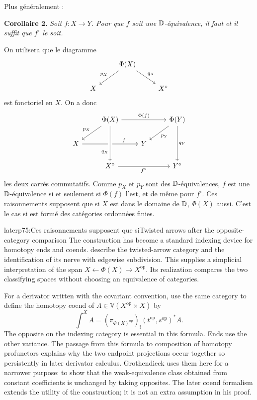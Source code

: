 \hspace*{\parindent}Plus généralement :

\textbf{Corollaire 2.} \textit{Soit $f : X \to Y$. Pour que $f$ soit une $\mathbb{D}$-équivalence, il faut et il suffit que $f^\circ$ le soit.}

\hspace*{\parindent}On utilisera que le diagramme
\[
\begin{tikzcd}
& \Phi(X) \arrow[dl, "p_X"'] \arrow[dr, "q_X"] & \\
X & & X^\circ
\end{tikzcd}
\]
est fonctoriel en $X$. On a donc
\[
\begin{tikzcd}
& \Phi(X) \arrow[rr, "\Phi(f)"] \arrow[dl, "p_X"'] & & \Phi(Y) \arrow[dl, "p_Y"] \arrow[dd, "q_Y"] \\
X \arrow[rr, "f" near end] \arrow[from=1-2, to=3-2, "q_X"' near end, crossing over] & & Y & \\
& X^\circ \arrow[rr, "f^\circ"'] & & Y^\circ
\end{tikzcd}
\]
les deux carrés commutatifs. Comme $p_X$ et $p_Y$ sont des $\mathbb{D}$-équivalences, $f$ est une $\mathbb{D}$-équivalence si et seulement si $\Phi(f)$ l'est, et de même pour $f^\circ$. Ces raisonnements supposent que si $X$ est dans le domaine de $\mathbb{D}$, $\Phi(X)$ aussi. C'est le cas si \Dia{} est formé des catégories ordonnées finies.

\begin{dcomment}{later}{p75:Ces raisonnements supposent que si}{Twisted arrows after the opposite-category comparison}
The construction has become a standard indexing device for homotopy ends and coends. \citet[Example~7.2.9 and the footnote in Section~7.8]{Riehl2014} describe the twisted-arrow category and the identification of its nerve with edgewise subdivision. This supplies a simplicial interpretation of the span $X\leftarrow\Phi(X)\to X^{\mathrm{op}}$. Its realization compares the two classifying spaces without choosing an equivalence of categories.

For a derivator written with the covariant convention, \citet[Section~5]{PontoShulman2016} use the same category to define the homotopy coend of $A\in\mathbb V(X^{\mathrm{op}}\times X)$ by
\[
 \int^{X}A=(\pi_{\Phi(X)^{\mathrm{op}}})_!
       (t^{\mathrm{op}},s^{\mathrm{op}})^*A.
\]
The opposite on the indexing category is essential in this formula. Ends use the other variance. The passage from this formula to composition of homotopy profunctors explains why the two endpoint projections occur together so persistently in later derivator calculus. Grothendieck uses them here for a narrower purpose: to show that the weak-equivalence class obtained from constant coefficients is unchanged by taking opposites. The later coend formalism extends the utility of the construction; it is not an extra assumption in his proof.
\end{dcomment}


